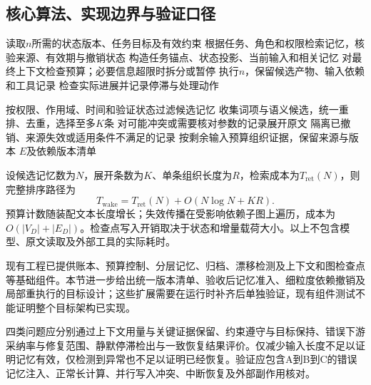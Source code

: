 \subsection{核心算法、实现边界与验证口径}

\begin{algorithm}[htbp]
\caption{共享状态与四级记忆驱动的节点执行}
\label{alg:anchor_runtime}
读取$n$所需的状态版本、任务目标及有效约束\;
根据任务、角色和权限检索记忆，核验来源、有效期与撤销状态\;
构造任务锚点、状态投影、当前输入和相关记忆\;
对最终上下文检查预算；必要信息超限时拆分或暂停\;
执行$n$，保留候选产物、输入依赖和工具记录\;
检查实际进展并记录停滞与处理动作\;
\end{algorithm}

\begin{algorithm}[htbp]
\caption{带有效性检查的分级证据唤醒}
\label{alg:anchor_wakeup}
按权限、作用域、时间和验证状态过滤候选记忆\;
收集词项与语义候选，统一重排、去重，选择至多$K$条\;
对可能冲突或需要核对参数的记录展开原文\;
隔离已撤销、来源失效或适用条件不满足的记录\;
按剩余输入预算组织证据，保留来源与版本\;
\Return $E$及依赖版本清单\;
\end{algorithm}

设候选记忆数为$N$，展开条数为$K$、单条组织长度为$R$，检索成本为$T_{\mathrm{ret}}(N)$，则完整排序路径为
\begin{equation}
T_{\mathrm{wake}}=T_{\mathrm{ret}}(N)+O(N\log N+KR).
\label{eq:anchor_wakeup_cost}
\end{equation}
预算计数随装配文本长度增长；失效传播在受影响依赖子图上遍历，成本为$O(|V_D|+|E_D|)$。检查点写入开销取决于状态和增量载荷大小。以上不包含模型、原文读取及外部工具的实际耗时。

现有工程已提供账本、预算控制、分层记忆、归档、漂移检测及上下文和图检查点等基础组件。本节进一步给出统一版本清单、验收后记忆准入、细粒度依赖撤销及局部重执行的目标设计；这些扩展需要在运行时补齐后单独验证，现有组件测试不能证明整个目标架构已实现。

四类问题应分别通过上下文用量与关键证据保留、约束遵守与目标保持、错误下游采纳率与修复范围、静默停滞检出与一致恢复结果评价。仅减少输入长度不足以证明记忆有效，仅检测到异常也不足以证明已经恢复。验证应包含A到B到C的错误记忆注入、正常长计算、并行写入冲突、中断恢复及外部副作用核对。

